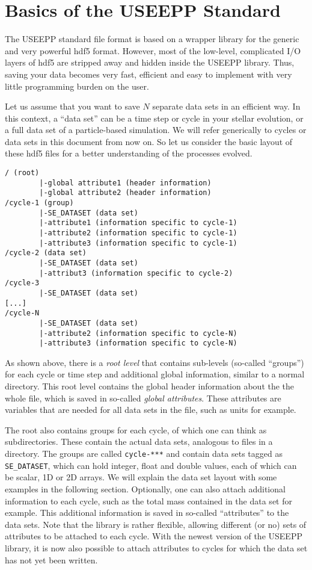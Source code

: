 

\section{Basics of the USEEPP Standard}\label{sec:basics}

The USEEPP standard file format is based on a wrapper library for the generic and very powerful hdf5 format. However, most of the low-level, complicated I/O layers of hdf5 are stripped away and hidden inside the USEEPP library. Thus, saving your data becomes very fast, efficient and easy to implement with very little programming burden on the user. 

Let us assume that you want to save $N$ separate data sets in an efficient way. In this context, a ``data set'' can be a time step or cycle in your stellar evolution, or a full data set of a particle-based simulation. We will refer generically to cycles or data sets in this document from now on. So let us consider the basic layout of these hdf5 files for a better understanding of the processes evolved.

\begin{verbatim}
/ (root)
        |-global attribute1 (header information)
        |-global attribute2 (header information)
/cycle-1 (group)
        |-SE_DATASET (data set)
        |-attribute1 (information specific to cycle-1)
        |-attribute2 (information specific to cycle-1)
        |-attribute3 (information specific to cycle-1)
/cycle-2 (data set)
        |-SE_DATASET (data set)
        |-attribut3 (information specific to cycle-2)
/cycle-3
        |-SE_DATASET (data set)
[...]
/cycle-N
        |-SE_DATASET (data set)
        |-attribute2 (information specific to cycle-N)
        |-attribute3 (information specific to cycle-N)
\end{verbatim}

As shown above, there is a {\it root level} that contains sub-levels (so-called ``groups'') for each cycle or time step and additional global information, similar to a normal directory. This root level contains the global header information about the the whole file, which is saved in so-called {\it global attributes}. These attributes are variables that are needed for all data sets in the file, such as units for example.

The root also contains groups for each cycle, of which one can think as subdirectories. These contain the actual data sets, analogous to files in a directory. The groups are called \verb!cycle-***! and contain data sets tagged as \verb!SE_DATASET!, which can hold integer, float and double values, each of which can be scalar, 1D or 2D arrays. We will explain the data set layout with some examples in the following section. Optionally, one can also attach additional information to each cycle, such as the total mass contained in the data set for example. This additional information is saved in so-called ``attributes'' to the data sets. Note that the library is rather flexible, allowing different (or no) sets of attributes to be attached to each cycle. With the newest version of the USEEPP library, it is now also possible to attach attributes to cycles for which the data set has not yet been written. 

